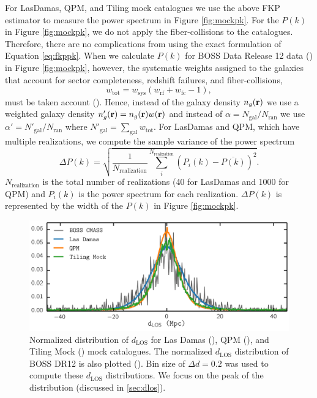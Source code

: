 \documentclass{emulateapj}
\begin{document}
For LasDamas, QPM, and Tiling mock catalogues we use the above FKP estimator to measure the power spectrum in Figure \ref{fig:mockpk}. For the $P(k)$ in Figure \ref{fig:mockpk}, we do not apply the fiber-collisions to the catalogues. Therefore, there are no complications from using the exact formulation of Equation \ref{eq:fkppk}. When we calculate $P(k)$ for BOSS Data Release 12 data (\cmasscolor) in Figure \ref{fig:mockpk}, however, the systematic weights assigned to the galaxies that account for sector completeness, redshift failures, and fiber-collisions, 
\begin{equation} \label{eq:weight}
w_\mathrm{tot} = w_\mathrm{sys} (w_\mathrm{rf} + w_\mathrm{fc} -1), 
\end{equation}
must be taken account (\citealt{Anderson:2012aa, Beutler:2014aa}). Hence, instead of the galaxy density $n_g({\bf r})$ we use a weighted galaxy density $n'_g({\bf r}) = n_g({\bf r}) w({\bf r})$ and instead of $\alpha = N_{\mathrm{gal}}/N_\mathrm{ran}$ we use $\alpha ' = N'_\mathrm{gal}/N_\mathrm{ran}$ where $N'_\mathrm{gal} = \sum_\mathrm{gal} w_\mathrm{tot}$. For LasDamas and QPM, which have multiple realizations, we compute the sample variance of the power spectrum
\begin{equation} \label{eq:pk_var}
\Delta P (k)= \sqrt{\frac{1}{N_\mathrm{realization}} \sum\limits_i^{N_\mathrm{realization}} (P_i(k)- \overline{P(k)})^2 }. 
\end{equation}
$N_\mathrm{realization}$ is the total number of realizations (40 for LasDamas and 1000 for QPM) and $P_i(k)$ is the power spectrum for each realization. $\Delta P(k)$ is represented by the width of the $P(k)$ in Figure \ref{fig:mockpk}. 

\begin{figure}
\begin{center}
\includegraphics[scale=0.575]{fcpaper_dlos_dist.png}
\caption{Normalized distribution of $d_{\mathrm{LOS}}$ for Las Damas (\ldgcolor), QPM (\qpmcolor), and Tiling Mock (\tmcolor) mock catalogues. The normalized $d_{\mathrm{LOS}}$ distribution of BOSS DR12 is also plotted (\cmasscolor). Bin size of $\Delta d = 0.2$ was used to compute these $d_{\mathrm{LOS}}$ distributions. We focus on the peak of the distribution (discussed in \ref{sec:dlos}).} \label{fig:d_los}
\end{center}
\end{figure}
\end{document}
